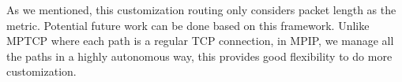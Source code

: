 As we mentioned, this customization routing only considers packet length as the metric. Potential future work can be done based on this framework. Unlike MPTCP where each path is a regular TCP connection, in MPIP, we manage all the paths in a highly autonomous way, this provides good flexibility to do more customization.


%
%



